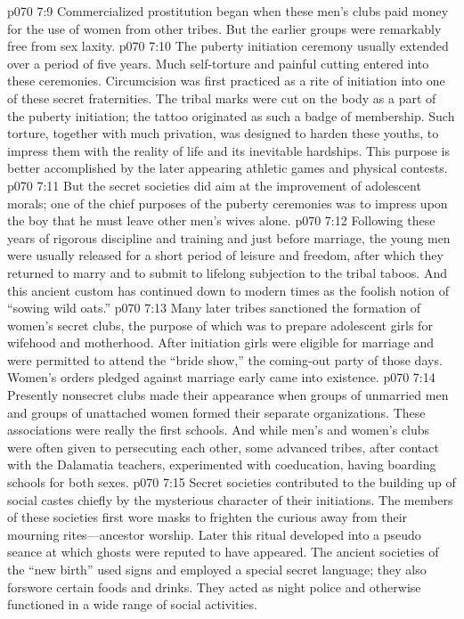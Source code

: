 \vs p070 7:9 Commercialized prostitution began when these men’s clubs paid money for the use of women from other tribes. But the earlier groups were remarkably free from sex laxity.
\vs p070 7:10 The puberty initiation ceremony usually extended over a period of five years. Much self\hyp{}torture and painful cutting entered into these ceremonies. Circumcision was first practiced as a rite of initiation into one of these secret fraternities. The tribal marks were cut on the body as a part of the puberty initiation; the tattoo originated as such a badge of membership. Such torture, together with much privation, was designed to harden these youths, to impress them with the reality of life and its inevitable hardships. This purpose is better accomplished by the later appearing athletic games and physical contests.
\vs p070 7:11 But the secret societies did aim at the improvement of adolescent morals; one of the chief purposes of the puberty ceremonies was to impress upon the boy that he must leave other men’s wives alone.
\vs p070 7:12 Following these years of rigorous discipline and training and just before marriage, the young men were usually released for a short period of leisure and freedom, after which they returned to marry and to submit to lifelong subjection to the tribal taboos. And this ancient custom has continued down to modern times as the foolish notion of “sowing wild oats.”
\pc \vs p070 7:13 Many later tribes sanctioned the formation of women’s secret clubs, the purpose of which was to prepare adolescent girls for wifehood and motherhood. After initiation girls were eligible for marriage and were permitted to attend the “bride show,” the coming\hyp{}out party of those days. Women’s orders pledged against marriage early came into existence.
\vs p070 7:14 Presently nonsecret clubs made their appearance when groups of unmarried men and groups of unattached women formed their separate organizations. These associations were really the first schools. And while men’s and women’s clubs were often given to persecuting each other, some advanced tribes, after contact with the Dalamatia teachers, experimented with coeducation, having boarding schools for both sexes.
\pc \vs p070 7:15 Secret societies contributed to the building up of social castes chiefly by the mysterious character of their initiations. The members of these societies first wore masks to frighten the curious away from their mourning rites---ancestor worship. Later this ritual developed into a pseudo seance at which ghosts were reputed to have appeared. The ancient societies of the “new birth” used signs and employed a special secret language; they also forswore certain foods and drinks. They acted as night police and otherwise functioned in a wide range of social activities.
